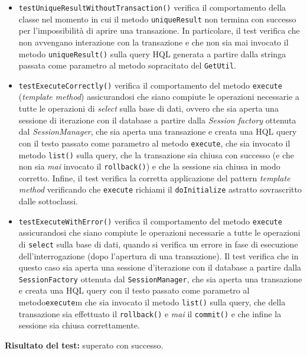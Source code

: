 \begin{itemize}
\begin{itemize}
\item \texttt{testUniqueResultWithoutTransaction()} verifica il comportamento della classe nel momento in cui il metodo \texttt{uniqueResult} non termina con successo per l'impossibilità di aprire una transazione. In particolare, il test verifica che non avvengano interazione con la transazione e che non sia mai invocato il metodo \texttt{uniqueResult()} sulla query HQL generata a partire dalla stringa passata come parametro al metodo sopracitato del \texttt{GetUtil}.

\item \texttt{testExecuteCorrectly()} verifica il comportamento del metodo \texttt{execute} (\textit{template method}) assicurandosi che siano compiute le operazioni necessarie a tutte le operazioni di \textit{select} sulla base di dati, ovvero che sia aperta una sessione di iterazione con il database a partire dalla \textit{Session factory} ottenuta dal \textit{SessionManager}, che sia aperta una transazione e creata una HQL query con il testo passato come parametro al metodo \texttt{execute}, che sia invocato il metodo \texttt{list()} sulla query, che la transazione sia chiusa con successo (e che non sia \textit{mai} invocato il \texttt{rollback()}) e che la sessione sia chiusa in modo corretto. Infine, il test verifica la corretta applicazione del pattern \textit{template method} verificando che \texttt{execute} richiami il \texttt{doInitialize} astratto sovrascritto dalle sottoclassi.

\item \texttt{testExecuteWithError()} verifica il comportamento del metodo \texttt{execute} assicurandosi che siano compiute le operazioni necessarie a tutte le operazioni di \texttt{select} sulla base di dati, quando si verifica un errore in fase di esecuzione dell'interrogazione (dopo l'apertura di una transazione). Il test verifica che in questo caso sia aperta una sessione d'iterazione con il database a partire dalla \texttt{SessionFactory} ottenuta dal \texttt{SessionManager}, che sia aperta una transazione e creata una HQL query con il testo passato come parametro al metodo\texttt{execute}m che sia invocato il metodo \texttt{list()} sulla query, che della transazione sia effettuato il \texttt{rollback()} e \textit{mai} il \texttt{commit()} e che infine la sessione sia chiusa correttamente.

\end{itemize}
\textbf{Risultato del test:} superato con successo.

\end{itemize}


